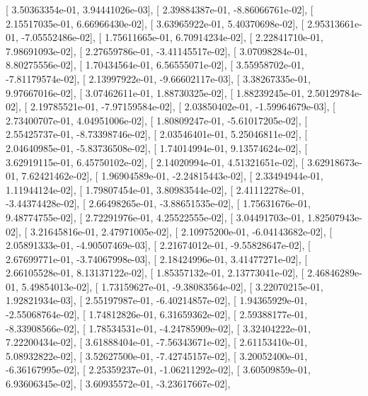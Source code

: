 \documentclass{article}
\begin{document}
       [  3.50363354e-01,   3.94441026e-03],
       [  2.39884387e-01,  -8.86066761e-02],
       [  2.15517035e-01,   6.66966430e-02],
       [  3.63965922e-01,   5.40370698e-02],
       [  2.95313661e-01,  -7.05552486e-02],
       [  1.75611665e-01,   6.70914234e-02],
       [  2.22841710e-01,   7.98691093e-02],
       [  2.27659786e-01,  -3.41145517e-02],
       [  3.07098284e-01,   8.80275556e-02],
       [  1.70434564e-01,   6.56555071e-02],
       [  3.55958702e-01,  -7.81179574e-02],
       [  2.13997922e-01,  -9.66602117e-03],
       [  3.38267335e-01,   9.97667016e-02],
       [  3.07462611e-01,   1.88730325e-02],
       [  1.88239245e-01,   2.50129784e-02],
       [  2.19785521e-01,  -7.97159584e-02],
       [  2.03850402e-01,  -1.59964679e-03],
       [  2.73400707e-01,   4.04951006e-02],
       [  1.80809247e-01,  -5.61017205e-02],
       [  2.55425737e-01,  -8.73398746e-02],
       [  2.03546401e-01,   5.25046811e-02],
       [  2.04640985e-01,  -5.83736508e-02],
       [  1.74014994e-01,   9.13574624e-02],
       [  3.62919115e-01,   6.45750102e-02],
       [  2.14020994e-01,   4.51321651e-02],
       [  3.62918673e-01,   7.62421462e-02],
       [  1.96904589e-01,  -2.24815443e-02],
       [  2.33494944e-01,   1.11944124e-02],
       [  1.79807454e-01,   3.80983544e-02],
       [  2.41112278e-01,  -3.44374428e-02],
       [  2.66498265e-01,  -3.88651535e-02],
       [  1.75631676e-01,   9.48774755e-02],
       [  2.72291976e-01,   4.25522555e-02],
       [  3.04491703e-01,   1.82507943e-02],
       [  3.21645816e-01,   2.47971005e-02],
       [  2.10975200e-01,  -6.04143682e-02],
       [  2.05891333e-01,  -4.90507469e-03],
       [  2.21674012e-01,  -9.55828647e-02],
       [  2.67699771e-01,  -3.74067998e-03],
       [  2.18424996e-01,   3.41477271e-02],
       [  2.66105528e-01,   8.13137122e-02],
       [  1.85357132e-01,   2.13773041e-02],
       [  2.46846289e-01,   5.49854013e-02],
       [  1.73159627e-01,  -9.38083564e-02],
       [  3.22070215e-01,   1.92821934e-03],
       [  2.55197987e-01,  -6.40214857e-02],
       [  1.94365929e-01,  -2.55068764e-02],
       [  1.74812826e-01,   6.31659362e-02],
       [  2.59388177e-01,  -8.33908566e-02],
       [  1.78534531e-01,  -4.24785909e-02],
       [  3.32404222e-01,   7.22200434e-02],
       [  3.61888404e-01,  -7.56343671e-02],
       [  2.61153410e-01,   5.08932822e-02],
       [  3.52627500e-01,  -7.42745157e-02],
       [  3.20052400e-01,  -6.36167995e-02],
       [  2.25359237e-01,  -1.06211292e-02],
       [  3.60509859e-01,   6.93606345e-02],
       [  3.60935572e-01,  -3.23617667e-02],
\end{document}
